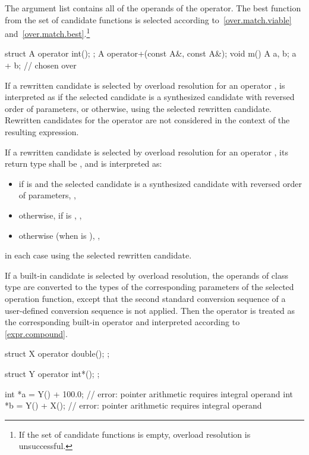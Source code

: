 \pnum
The argument list contains all of the
operands of the operator.
The best function from the set of candidate functions is selected
according to~\ref{over.match.viable}
and~\ref{over.match.best}.\footnote{If the set of candidate functions is empty,
overload resolution is unsuccessful.}
\begin{example}

\begin{codeblock}
struct A {
  operator int();
};
A operator+(const A&, const A&);
void m() {
  A a, b;
  a + b;                        //  chosen over 
}
\end{codeblock}
\end{example}

\pnum
If a rewritten  candidate
is selected by overload resolution
for an operator ,
is interpreted as
if the selected candidate is a synthesized candidate
with reversed order of parameters,
or  otherwise,
using the selected rewritten  candidate.
Rewritten candidates for the operator 
are not considered in the context of the resulting expression.

\pnum
If a rewritten  candidate
is selected by overload resolution
for an operator ,
its return type shall be \cv{} , and
 is interpreted as:
\begin{itemize}
\item
if  is \tcode{!=}
and the selected candidate is a synthesized candidate
with reversed order of parameters,
,
\item
otherwise, if  is \tcode{!=},
,
\item
otherwise (when  is \tcode{==}),
,
\end{itemize}
in each case using the selected rewritten  candidate.

\pnum
If a built-in candidate is selected by overload resolution, the
operands of class type are converted to the types of the corresponding parameters
of the selected operation function, except that the second standard conversion
sequence of a user-defined conversion sequence is not applied.
Then the operator is treated as the corresponding
built-in operator and interpreted according to \ref{expr.compound}.
\begin{example}
\begin{codeblock}
struct X {
  operator double();
};

struct Y {
  operator int*();
};

int *a = Y() + 100.0;           // error: pointer arithmetic requires integral operand
int *b = Y() + X();             // error: pointer arithmetic requires integral operand
\end{codeblock}
\end{example}


